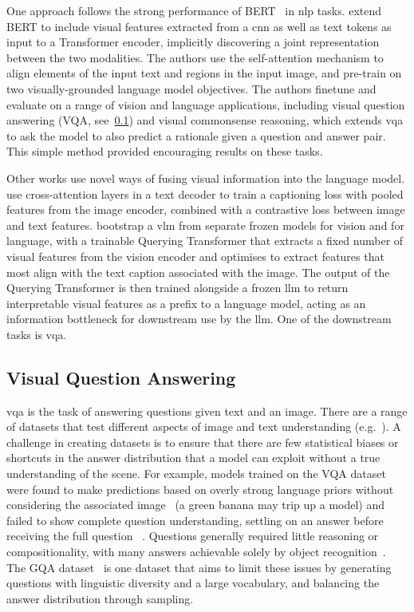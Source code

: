 One approach follows the strong performance of BERT~\cite{devlin2019bert} in
\acrshort{nlp} tasks. \citet{li2019visualbert} extend BERT to include visual
features extracted from a \acrshort{cnn} as well as text tokens as input to a
Transformer encoder, implicitly discovering a joint representation between the
two modalities. The authors use the self-attention mechanism to align elements
of the input text and regions in the input image, and pre-train on two
visually-grounded language model objectives. The authors finetune and evaluate
on a range of vision and language applications, including visual question
answering (VQA, see~\cref{ssec:vqa}) and visual commonsense reasoning, which
extends \acrshort{vqa} to ask the model to also predict a rationale given a
question and answer pair. This simple method provided encouraging results on
these tasks.

Other works use novel ways of fusing visual information into the language
model. \citet{yu2022coca} use cross-attention layers in a text decoder to train
a captioning loss with pooled features from the image encoder, combined with a
contrastive loss between image and text features. \citet{li2023blip2}
bootstrap a \acrshort{vlm} from separate frozen models for vision and for
language, with a trainable Querying Transformer that extracts a fixed number of
visual features from the vision encoder and optimises to extract features that
most align with the text caption associated with the image. The output of the
Querying Transformer is then trained alongside a frozen \acrshort{llm} to
return interpretable visual features as a prefix to a language model, acting as
an information bottleneck for downstream use by the \acrshort{llm}. One of the
downstream tasks is \acrlong{vqa}.

\subsection{Visual Question Answering}
\label{ssec:vqa}

\Acrfull{vqa} is the task of answering questions given text and an
image. There are a range of datasets that test different aspects of image and
text understanding (e.g.~\cite{johnson2017clevr,hudson2019gqa,antol2015vqa}). A
challenge in creating datasets is to ensure that there are few statistical
biases or shortcuts in the answer distribution that a model can exploit without
a true understanding of the scene. For example, models trained on the VQA
dataset~\citep{antol2015vqa} were found to make predictions based on overly
strong language priors without considering the associated
image~\citep{zhang2016yin} (a green banana may trip up a model) and failed to
show complete question understanding, settling on an answer before receiving
the full question ~\citep{agrawal2016analyzing}. Questions generally required
little reasoning or compositionality, with many answers achievable solely by
object recognition~\citep{hudson2019gqa}. The GQA dataset~\citep{hudson2019gqa}
is one dataset that aims to limit these issues by generating questions with
linguistic diversity and a large vocabulary, and balancing the answer
distribution through sampling. 

